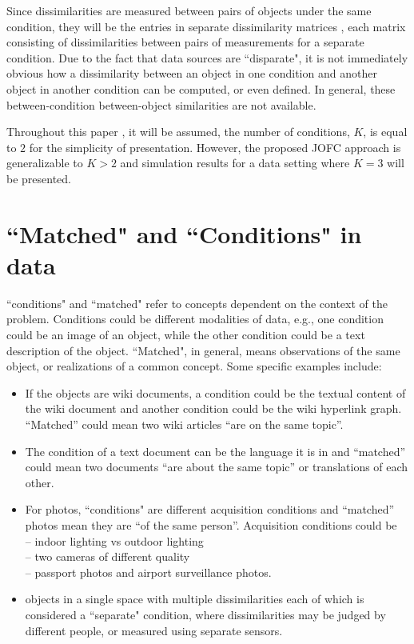 \documentclass[11pt]{article} %
\begin{document}
 Since dissimilarities are  measured between pairs of objects under the same condition, they will be the entries in  
 separate dissimilarity matrices , each matrix consisting of dissimilarities between pairs of  measurements for a separate condition.
 Due to the fact that data sources are ``disparate", it is not immediately obvious how  a dissimilarity between an object in one condition and another object in another condition  can be computed, or even defined.  In general, these between-condition between-object  similarities are not available. 

Throughout this paper , it will be assumed,  the number of conditions, $K$, is equal to $2$ for the  simplicity of presentation. However, the proposed JOFC approach is  generalizable  to $K>2$ and  simulation results for a data setting where $K=3$ will be presented.

\section{``Matched" and ``Conditions" in data}

 ``conditions" and ``matched" refer to concepts dependent on the context of the  problem. Conditions could be different modalities of data, e.g., one condition could be  an image of an object, while the other condition could be a text description of the object. ``Matched", in general, means observations of the same object, or realizations of a common concept. Some specific examples include:

  \begin{itemize}
    \item
If the objects are wiki documents, a condition could be the textual content of the wiki document and another condition could be the wiki hyperlink graph. ``Matched'' could mean two  wiki articles ``are on the same topic''.
\item
The condition of a text document can be the language it is in and ``matched'' could mean two documents ``are about the same topic'' or translations of each other.

    \item For photos, ``conditions" are different acquisition conditions and ``matched'' photos mean they are  ``of the same person''. Acquisition conditions could be\\
    \hspace*{0.1 in}-- indoor lighting vs outdoor lighting\\
    \hspace*{0.1 in}-- two cameras of different quality\\
    \hspace*{0.1 in}-- passport photos and airport surveillance photos.
    \item   objects in a single space with multiple dissimilarities each of which is considered a ``separate" condition, where dissimilarities may be judged by different people, or measured using separate sensors.
  \end{itemize}
\end{document}
